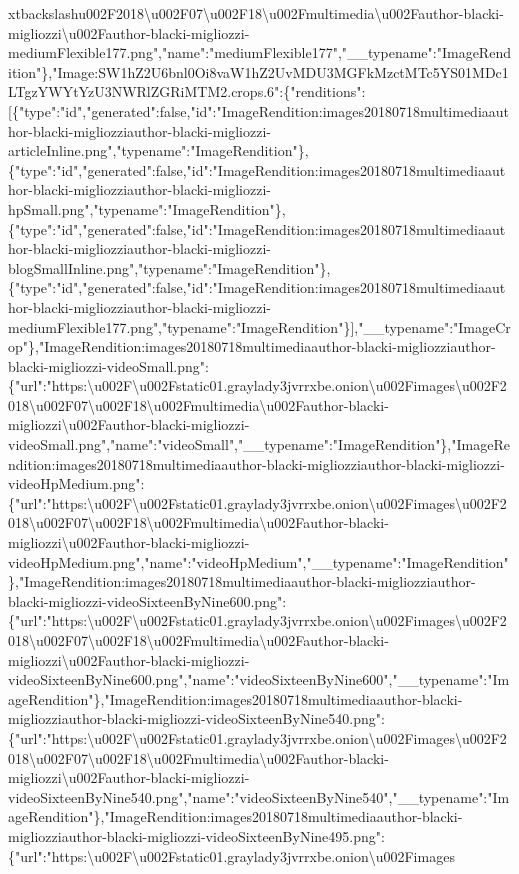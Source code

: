xtbackslash{}u002F2018\textbackslash{}u002F07\textbackslash{}u002F18\textbackslash{}u002Fmultimedia\textbackslash{}u002Fauthor-blacki-migliozzi\textbackslash{}u002Fauthor-blacki-migliozzi-mediumFlexible177.png","name":"mediumFlexible177","\_\_typename":"ImageRendition"\},"Image:SW1hZ2U6bnl0Oi8vaW1hZ2UvMDU3MGFkMzctMTc5YS01MDc1LTgzYWYtYzU3NWRlZGRiMTM2.crops.6":\{"renditions":{[}\{"type":"id","generated":false,"id":"ImageRendition:images20180718multimediaauthor-blacki-migliozziauthor-blacki-migliozzi-articleInline.png","typename":"ImageRendition"\},\{"type":"id","generated":false,"id":"ImageRendition:images20180718multimediaauthor-blacki-migliozziauthor-blacki-migliozzi-hpSmall.png","typename":"ImageRendition"\},\{"type":"id","generated":false,"id":"ImageRendition:images20180718multimediaauthor-blacki-migliozziauthor-blacki-migliozzi-blogSmallInline.png","typename":"ImageRendition"\},\{"type":"id","generated":false,"id":"ImageRendition:images20180718multimediaauthor-blacki-migliozziauthor-blacki-migliozzi-mediumFlexible177.png","typename":"ImageRendition"\}{]},"\_\_typename":"ImageCrop"\},"ImageRendition:images20180718multimediaauthor-blacki-migliozziauthor-blacki-migliozzi-videoSmall.png":\{"url":"https:\textbackslash{}u002F\textbackslash{}u002Fstatic01.graylady3jvrrxbe.onion\textbackslash{}u002Fimages\textbackslash{}u002F2018\textbackslash{}u002F07\textbackslash{}u002F18\textbackslash{}u002Fmultimedia\textbackslash{}u002Fauthor-blacki-migliozzi\textbackslash{}u002Fauthor-blacki-migliozzi-videoSmall.png","name":"videoSmall","\_\_typename":"ImageRendition"\},"ImageRendition:images20180718multimediaauthor-blacki-migliozziauthor-blacki-migliozzi-videoHpMedium.png":\{"url":"https:\textbackslash{}u002F\textbackslash{}u002Fstatic01.graylady3jvrrxbe.onion\textbackslash{}u002Fimages\textbackslash{}u002F2018\textbackslash{}u002F07\textbackslash{}u002F18\textbackslash{}u002Fmultimedia\textbackslash{}u002Fauthor-blacki-migliozzi\textbackslash{}u002Fauthor-blacki-migliozzi-videoHpMedium.png","name":"videoHpMedium","\_\_typename":"ImageRendition"\},"ImageRendition:images20180718multimediaauthor-blacki-migliozziauthor-blacki-migliozzi-videoSixteenByNine600.png":\{"url":"https:\textbackslash{}u002F\textbackslash{}u002Fstatic01.graylady3jvrrxbe.onion\textbackslash{}u002Fimages\textbackslash{}u002F2018\textbackslash{}u002F07\textbackslash{}u002F18\textbackslash{}u002Fmultimedia\textbackslash{}u002Fauthor-blacki-migliozzi\textbackslash{}u002Fauthor-blacki-migliozzi-videoSixteenByNine600.png","name":"videoSixteenByNine600","\_\_typename":"ImageRendition"\},"ImageRendition:images20180718multimediaauthor-blacki-migliozziauthor-blacki-migliozzi-videoSixteenByNine540.png":\{"url":"https:\textbackslash{}u002F\textbackslash{}u002Fstatic01.graylady3jvrrxbe.onion\textbackslash{}u002Fimages\textbackslash{}u002F2018\textbackslash{}u002F07\textbackslash{}u002F18\textbackslash{}u002Fmultimedia\textbackslash{}u002Fauthor-blacki-migliozzi\textbackslash{}u002Fauthor-blacki-migliozzi-videoSixteenByNine540.png","name":"videoSixteenByNine540","\_\_typename":"ImageRendition"\},"ImageRendition:images20180718multimediaauthor-blacki-migliozziauthor-blacki-migliozzi-videoSixteenByNine495.png":\{"url":"https:\textbackslash{}u002F\textbackslash{}u002Fstatic01.graylady3jvrrxbe.onion\textbackslash{}u002Fimages\textbackslas